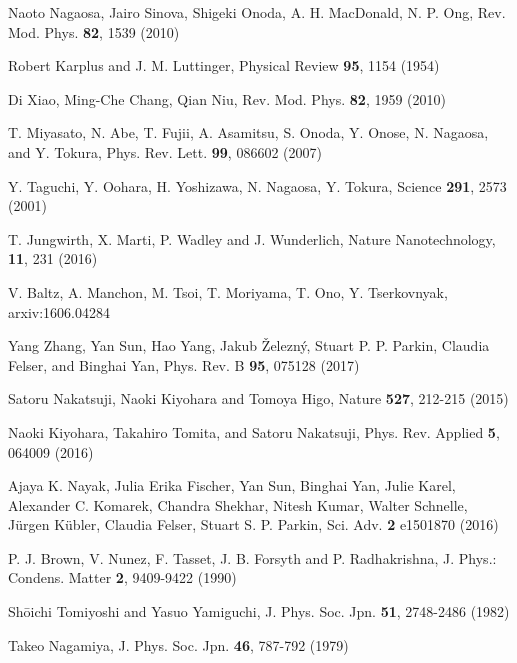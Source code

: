 \documentclass[prb,twocolumn,showpacs,preprintnumbers,amsmath,amssymb]{revtex4}
\begin{document}
\begin{thebibliography}{}


Naoto Nagaosa, Jairo Sinova, Shigeki Onoda, A. H. MacDonald, N. P. Ong, Rev. Mod. Phys. {\bf 82}, 1539 (2010)

Robert Karplus and J. M. Luttinger, Physical Review {\bf 95}, 1154 (1954)

Di Xiao, Ming-Che Chang, Qian Niu, Rev. Mod. Phys. {\bf 82}, 1959 (2010)

T. Miyasato, N. Abe, T. Fujii, A. Asamitsu, S. Onoda, Y. Onose, N. Nagaosa, and Y. Tokura, Phys. Rev. Lett. {\bf 99}, 086602 (2007)

Y. Taguchi, Y. Oohara, H. Yoshizawa, N. Nagaosa, Y. Tokura, Science {\bf 291}, 2573 (2001)

T. Jungwirth, X. Marti, P. Wadley and J. Wunderlich, Nature Nanotechnology, {\bf 11}, 231 (2016)

V. Baltz, A. Manchon, M. Tsoi, T. Moriyama, T. Ono, Y. Tserkovnyak, arxiv:1606.04284

Yang Zhang, Yan Sun, Hao Yang, Jakub {\v{Z}}elezn{\'y}, Stuart P. P. Parkin, Claudia Felser, and Binghai Yan, Phys. Rev. B {\bf 95}, 075128 (2017) 

Satoru Nakatsuji, Naoki Kiyohara and Tomoya Higo, Nature {\bf 527}, 212-215 (2015)

Naoki Kiyohara, Takahiro Tomita, and Satoru Nakatsuji, Phys. Rev. Applied {\bf 5}, 064009 (2016)

Ajaya K. Nayak, Julia Erika Fischer, Yan Sun, Binghai Yan, Julie Karel, Alexander C. Komarek, Chandra Shekhar, Nitesh Kumar, Walter Schnelle, J{\"u}rgen K{\"u}bler, Claudia Felser, Stuart S. P. Parkin, Sci. Adv. {\bf 2} e1501870 (2016)

P. J. Brown, V. Nunez, F. Tasset, J. B. Forsyth and P. Radhakrishna, J. Phys.: Condens. Matter {\bf 2}, 9409-9422 (1990)

Sh{\=o}ichi Tomiyoshi and Yasuo Yamiguchi,  J. Phys. Soc. Jpn. {\bf 51}, 2748-2486 (1982)




Takeo Nagamiya, J. Phys. Soc. Jpn. {\bf 46}, 787-792 (1979)


\end{thebibliography}
\end{document}
